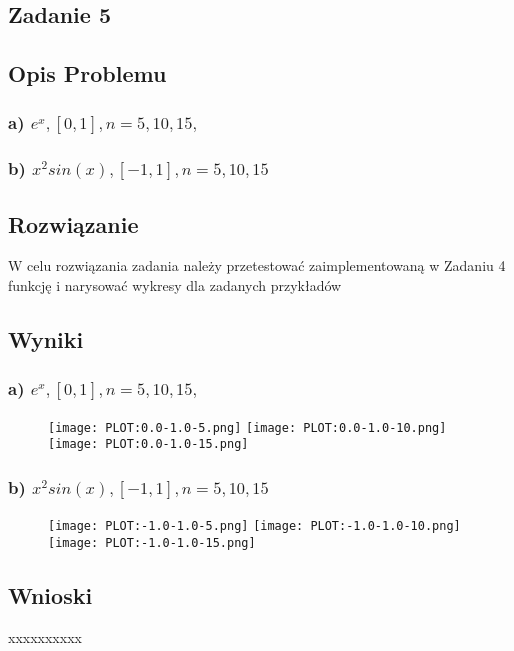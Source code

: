 \documentclass[11pt]{article}
\begin{document}
\begin{flushleft}
\newpage
\section{Zadanie 5}
\subsection{Opis Problemu}
\subsubsection{a) $ e^x,[0,1],n= 5,10,15,$}
\subsubsection{b) $ x^2sin(x),[−1,1],n= 5,10,15$}
\subsection{Rozwiązanie}
W celu rozwiązania zadania należy przetestować zaimplementowaną w Zadaniu 4 funkcję i narysować wykresy dla zadanych przykładów
\subsection{Wyniki}
\subsubsection{a) $ e^x,[0,1],n= 5,10,15,$}
\begin{figure}[htbp]
\centering
\texttt{[image: PLOT:0.0-1.0-5.png]}
\texttt{[image: PLOT:0.0-1.0-10.png]}
\texttt{[image: PLOT:0.0-1.0-15.png]}
\end{figure}
\newpage
\subsubsection{b) $ x^2sin(x),[−1,1],n= 5,10,15$}
\begin{figure}[htbp]
\centering
\texttt{[image: PLOT:-1.0-1.0-5.png]}
\texttt{[image: PLOT:-1.0-1.0-10.png]}
\texttt{[image: PLOT:-1.0-1.0-15.png]}
\end{figure}

\subsection{Wnioski}
xxxxxxxxxx


\end{flushleft}
\end{document}
